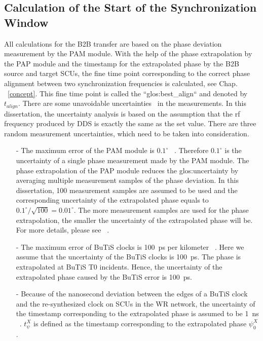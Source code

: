 \subsection{Calculation of the Start of the Synchronization Window}
All calculations for the B2B transfer are based on the phase deviation measurement by the PAM module. With the help of the phase extrapolation by the PAP module and the timestamp for the extrapolated phase by the B2B source and target SCUs, the fine time point corresponding to the correct phase alignment between two synchronization frequencies is calculated, see Chap. ~\ref{concept}. This fine time point is called the ``\gls{glos:best_align}`` and denoted by $t_\mathit{align}$. There are some unavoidable uncertainties~\cite{taylor_introduction_1982} in the measurements. In this dissertation, the uncertainty analysis is based on the assumption that the rf frequency produced by DDS is exactly the same as the set value. There are three random measurement uncertainties, which need to be taken into consideration.  
\begin{itemize}
\item[-]The maximum error of the PAM module is $0.1^\circ$ ~\cite{klingbeil_detailed_2013}. Therefore $0.1^\circ$ is the uncertainty of a single phase measurement made by the PAM module. The phase extrapolation of the PAP module reduces the \gls{glos:uncertainty} by averaging multiple measurement samples of the phase deviation. In this dissertation, 100 measurement samples are assumed to be used and the corresponding uncertainty of the extrapolated phase equals to $0.1^\circ/\sqrt{100} =0.01^\circ$. The more measurement samples are used for the phase extrapolation, the smaller the uncertainty of the extrapolated phase will be. For more details, please see ~\cite{ferrand_development_nodate}.
\item[-]The maximum error of BuTiS clocks is \SI{100}{\ps} per kilometer ~\cite{moritz_f-cs-rf-14e_2012}. Here we assume that the uncertainty of the BuTiS clocks is \SI{100}{\ps}. The phase is extrapolated at BuTiS T0 incidents. Hence, the uncertainty of the extrapolated phase caused by the BuTiS error is \SI{100}{\ps}. 
\item[-]Because of the nanosecond deviation between the edges of a BuTiS clock and the re-synthesized clock on SCUs in the WR network, the uncertainty of the timestamp corresponding to the extrapolated phase is assumed to be \SI{1}{ns} ~\cite{kreider_receiver_2014}. $t_\psi^X$ is defined as the timestamp corresponding to the extrapolated phase $\psi^\mathit{X}_0$.
\end{itemize}
 
